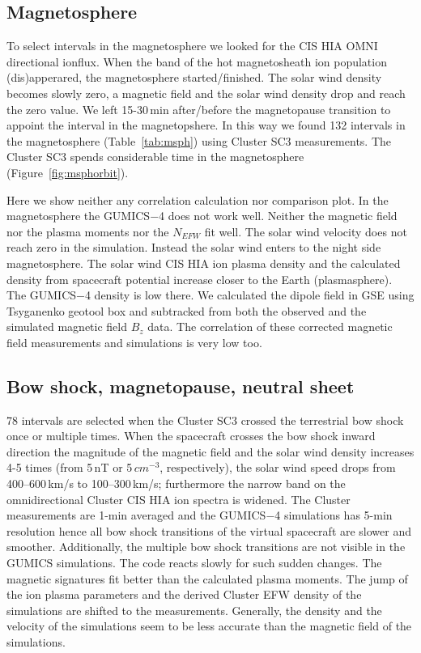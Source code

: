 \documentclass[linenumbers,draft]{agujournal}
\begin{document}
\subsection{Magnetosphere}
\label{sec:msph}

To select intervals in the magnetosphere we looked for the CIS HIA OMNI directional ionflux. When the band of the hot magnetosheath ion population (dis)apperared, the magnetosphere started/finished. The solar wind density becomes slowly zero, a magnetic field and the solar wind density drop and reach the zero value. We left 15-30\,min after/before the magnetopause transition to appoint the interval in the magnetopshere. In this way we found 132 intervals in the magnetosphere (Table~\ref{tab:msph}) using Cluster SC3 measurements. The Cluster SC3 spends considerable time in the magnetosphere (Figure~\ref{fig:msphorbit}). 

Here we show neither any correlation calculation nor comparison plot. In the magnetosphere the GUMICS$-$4 does not work well. Neither the magnetic field nor the plasma moments nor the $N_{EFW}$ fit well. The solar wind velocity does not reach zero in the simulation. Instead the solar wind enters to the night side magnetosphere. The solar wind CIS HIA ion plasma density and the calculated density from spacecraft potential increase closer to the Earth (plasmasphere). The GUMICS$-$4 density is low there. We calculated the dipole field in GSE using Tsyganenko geotool box \citep{tsyganenko95:_model_earth} and subtracked from both the observed and the simulated magnetic field $B_z$ data. The correlation of these corrected magnetic field measurements and simulations is very low too. 

\subsection{Bow shock, magnetopause, neutral sheet}
\label{sec:bs}

78 intervals are selected when the Cluster SC3 crossed the terrestrial bow shock once or multiple times. When the spacecraft crosses the bow shock inward direction the magnitude of the magnetic field and the solar wind density increases 4-5 times (from 5\,nT or 5\,$cm^{-3}$, respectively), the solar wind speed drops from 400--600\,km/s to 100--300\,km/s; furthermore the narrow band on the omnidirectional Cluster CIS HIA ion spectra is widened. The Cluster measurements are 1-min averaged and the GUMICS$-$4 simulations has 5-min resolution hence all bow shock transitions of the virtual spacecraft are slower and smoother. Additionally, the multiple bow shock transitions are not visible in the $\mathrm{GUMICS}$ simulations. The code reacts slowly for such sudden changes. The magnetic signatures fit better than the calculated plasma moments. The jump of the ion plasma parameters and the derived Cluster EFW density of the simulations are shifted to the measurements. Generally, the density and the velocity of the simulations seem to be less accurate than the magnetic field of the simulations.
\end{document}
